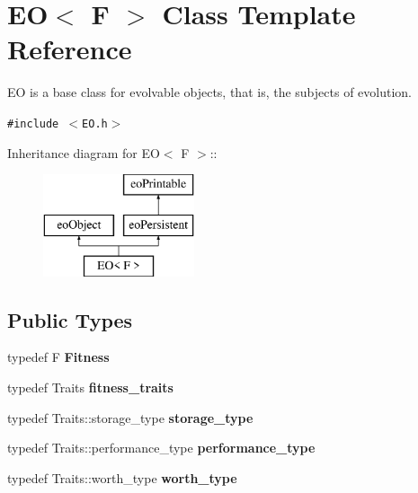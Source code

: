 \section{EO$<$ F $>$ Class Template Reference}
\label{class_e_o}
EO is a base class for evolvable objects, that is, the subjects of evolution.  


{\tt \#include $<$EO.h$>$}

Inheritance diagram for EO$<$ F $>$::\begin{figure}[H]
\begin{center}
\leavevmode
\includegraphics[height=3cm]{class_e_o}
\end{center}
\end{figure}
\subsection*{Public Types}
\begin{CompactItemize}
\item 
typedef F {\bf Fitness}\label{class_e_o_w0}

\item 
typedef Traits {\bf fitness\_\-traits}\label{class_e_o_w1}

\item 
typedef Traits::storage\_\-type {\bf storage\_\-type}\label{class_e_o_w2}

\item 
typedef Traits::performance\_\-type {\bf performance\_\-type}\label{class_e_o_w3}

\item 
typedef Traits::worth\_\-type {\bf worth\_\-type}\label{class_e_o_w4}

\end{CompactItemize}
